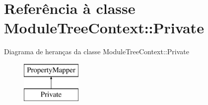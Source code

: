 \hypertarget{class_module_tree_context_1_1_private}{\section{Referência à classe Module\-Tree\-Context\-:\-:Private}
\label{class_module_tree_context_1_1_private}
}
Diagrama de heranças da classe Module\-Tree\-Context\-:\-:Private\begin{figure}[H]
\begin{center}
\leavevmode
\includegraphics[height=2.000000cm]{class_module_tree_context_1_1_private}
\end{center}
\end{figure}
